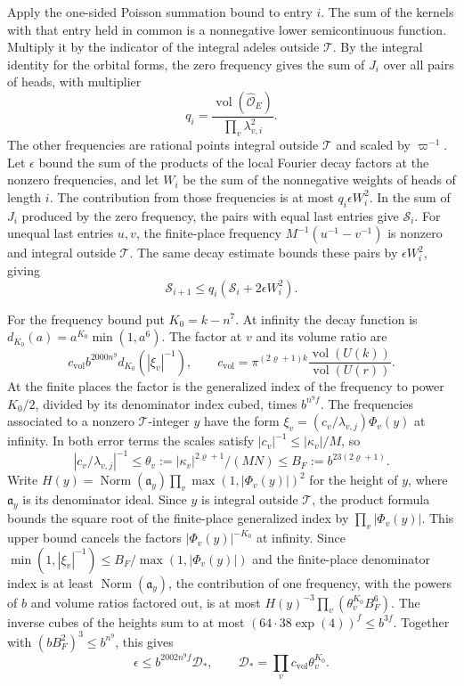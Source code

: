 Apply the one-sided Poisson summation bound to entry \(i\).
The sum of the kernels with that entry held in common is a nonnegative
lower semicontinuous function. Multiply it by the indicator of the
integral adeles outside \(\mathcal T\). By the integral identity for the
orbital forms, the zero frequency gives the sum of \(J_i\) over all
pairs of heads, with multiplier
\[
  q_i=\frac{\operatorname{vol}(\widehat{\mathcal O}_E)}
                 {\prod_v\lambda_{v,i}^2}.
\]
The other frequencies are rational points integral outside \(\mathcal T\)
and scaled by \(\varpi^{-1}\). Let \(\epsilon\) bound the sum of the
products of the local Fourier decay factors at the nonzero frequencies,
and let \(W_i\) be the sum of the nonnegative weights of heads of length \(i\).
The contribution from those frequencies is at most \(q_i\epsilon W_i^2\).
In the sum of \(J_i\) produced by the zero frequency, the pairs with
equal last entries give \(\mathcal S_i\). For unequal last entries \(u,v\), the
finite-place frequency \(M^{-1}(u^{-1}-v^{-1})\) is nonzero and integral
outside \(\mathcal T\). The same decay estimate bounds these pairs by
\(\epsilon W_i^2\), giving
\[
 \mathcal S_{i+1}\le q_i(\mathcal S_i+2\epsilon W_i^2).
\]

For the frequency bound put \(K_0=k-n^7\).
At infinity the decay function is \(d_{K_0}(a)=a^{K_0}\min(1,a^6)\).
The factor at \(v\) and its volume ratio are
\[
 c_{\mathrm{vol}}b^{2000n^9}d_{K_0}(|\xi_v|^{-1}),
 \qquad
 c_{\mathrm{vol}}=\pi^{(2\varrho+1)k}
            \frac{\operatorname{vol}(U(k))}{\operatorname{vol}(U(r))}.
\]
At the finite places the factor is the generalized index of the frequency
to power \(K_0/2\), divided by its denominator index cubed, times \(b^{n^9 f}\).
The frequencies associated to a nonzero \(\mathcal T\)-integer \(y\)
have the form \(\xi_v=(c_v/\lambda_{v,j})\Phi_v(y)\) at infinity.
In both error terms the scales satisfy \(|c_v|^{-1}\le|\kappa_v|/M\), so
\[
 |c_v/\lambda_{v,j}|^{-1}\le
 \theta_v:=|\kappa_v|^{2\varrho+1}/(MN)
 \le B_F:=b^{23(2\varrho+1)}.
\]
Write \(H(y)=\operatorname{Norm}(\mathfrak a_y)\prod_v\max(1,|\Phi_v(y)|)^2\)
for the height of \(y\), where \(\mathfrak a_y\) is its denominator ideal.
Since \(y\) is integral outside \(\mathcal T\), the product formula bounds
the square root of the finite-place generalized index by
\(\prod_v|\Phi_v(y)|\). This upper bound cancels the factors
\(|\Phi_v(y)|^{-K_0}\) at infinity.
Since \(\min(1,|\xi_v|^{-1})\le B_F/\max(1,|\Phi_v(y)|)\) and the
finite-place denominator index is at least \(\operatorname{Norm}(\mathfrak a_y)\),
the contribution of one frequency, with the powers of \(b\) and volume
ratios factored out, is at most \(H(y)^{-3}\prod_v(\theta_v^{K_0}B_F^6)\).
The inverse cubes of the heights sum to at most
\((64\cdot38\exp(4))^f\le b^{3f}\).
Together with \((bB_F^2)^3\le b^{n^9}\), this gives
\[
 \epsilon\le b^{2002n^9f}\mathcal D_\ast,\qquad
 \mathcal D_\ast=\prod_v c_{\mathrm{vol}}\theta_v^{K_0}.
\]

